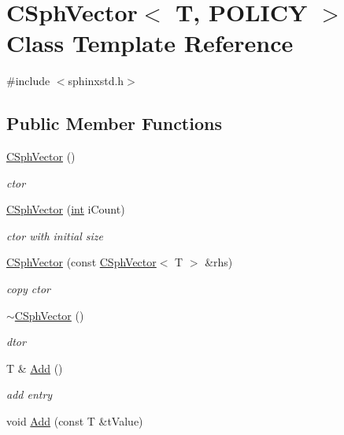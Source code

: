 \hypertarget{classCSphVector}{\section{C\-Sph\-Vector$<$ T, P\-O\-L\-I\-C\-Y $>$ Class Template Reference}
\label{classCSphVector}
}


{\ttfamily \#include $<$sphinxstd.\-h$>$}

\subsection*{Public Member Functions}
\begin{DoxyCompactItemize}
\item 
\hyperlink{classCSphVector_ae22e90c1df8a313d3bae2618942b6179}{C\-Sph\-Vector} ()
\begin{DoxyCompactList}\small\item\em ctor \end{DoxyCompactList}\item 
\hyperlink{classCSphVector_a997ba5244d9e09314e9ef987af394c0f}{C\-Sph\-Vector} (\hyperlink{sphinxexpr_8cpp_a4a26e8f9cb8b736e0c4cbf4d16de985e}{int} i\-Count)
\begin{DoxyCompactList}\small\item\em ctor with initial size \end{DoxyCompactList}\item 
\hyperlink{classCSphVector_a3bcabcf6fed3714126d9c86cf457ced4}{C\-Sph\-Vector} (const \hyperlink{classCSphVector}{C\-Sph\-Vector}$<$ T $>$ \&rhs)
\begin{DoxyCompactList}\small\item\em copy ctor \end{DoxyCompactList}\item 
\hyperlink{classCSphVector_a804f01dbe01dd31808d0e8a1745776be}{$\sim$\-C\-Sph\-Vector} ()
\begin{DoxyCompactList}\small\item\em dtor \end{DoxyCompactList}\item 
T \& \hyperlink{classCSphVector_a8fff86e823ec871dd7a5410f03535e5a}{Add} ()
\begin{DoxyCompactList}\small\item\em add entry \end{DoxyCompactList}\item 
void \hyperlink{classCSphVector_a971c51f7fc7af000d5ab3ac800586a3b}{Add} (const T \&t\-Value)

\end{DoxyCompactItemize}
